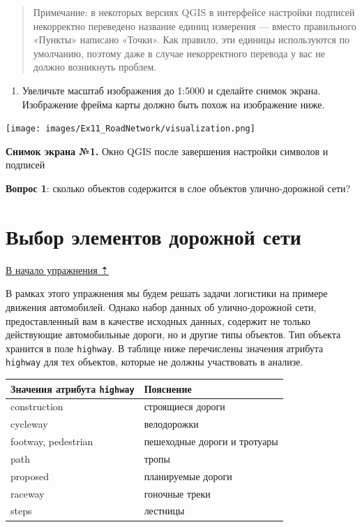 \documentclass[
  12pt,
]{book}
\providecommand{\tightlist}{%
  \setlength{\itemsep}{0pt}\setlength{\parskip}{0pt}}
\begin{document}
\begin{quote}
Примечание: в некоторых версиях QGIS в интерфейсе настройки подписей некорректно переведено название единиц измерения --- вместо правильного «Пункты» написано «Точки». Как правило, эти единицы используются по умолчанию, поэтому даже в случае некорректного перевода у вас не должно возникнуть проблем.
\end{quote}

\begin{enumerate}
\def\labelenumi{\arabic{enumi}.}
\setcounter{enumi}{6}
\tightlist
\item
  Увеличьте масштаб изображения до 1:5000 и сделайте снимок экрана. Изображение фрейма карты должно быть похож на изображение ниже.
\end{enumerate}

\texttt{[image: images/Ex11\_RoadNetwork/visualization.png]}

\textbf{Снимок экрана №1.} Окно QGIS после завершения настройки символов и подписей

\textbf{Вопрос 1}: сколько объектов содержится в слое объектов улично-дорожной сети?

\hypertarget{networks-query}{%
\section{Выбор элементов дорожной сети}\label{networks-query}}

\protect\hyperlink{networks}{В начало упражнения ⇡}

В рамках этого упражнения мы будем решать задачи логистики на примере движения автомобилей. Однако набор данных об улично-дорожной сети, предоставленный вам в качестве исходных данных, содержит не только действующие автомобильные дороги, но и другие типы объектов. Тип объекта хранится в поле \texttt{highway}. В таблице ниже перечислены значения атрибута \texttt{highway} для тех объектов, которые не должны участвовать в анализе.

\begin{longtable}[]{@{}ll@{}}
\toprule
Значения атрибута \texttt{highway} & Пояснение\tabularnewline
\midrule
\endhead
construction & строящиеся дороги\tabularnewline
cycleway & велодорожки\tabularnewline
footway, pedestrian & пешеходные дороги и тротуары\tabularnewline
path & тропы\tabularnewline
proposed & планируемые дороги\tabularnewline
raceway & гоночные треки\tabularnewline
steps & лестницы\tabularnewline
\bottomrule
\end{longtable}
\end{document}
